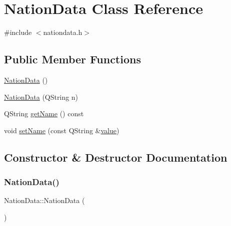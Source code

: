 \hypertarget{class_nation_data}{}\section{Nation\+Data Class Reference}
\label{class_nation_data}


{\ttfamily \#include $<$nationdata.\+h$>$}

\subsection*{Public Member Functions}
\begin{DoxyCompactItemize}
\item 
\mbox{\hyperlink{class_nation_data_a600b1be3c59998bbb7352c71548746bf}{Nation\+Data}} ()
\item 
\mbox{\hyperlink{class_nation_data_aaf364c5ac1dd356170aadba095831e12}{Nation\+Data}} (Q\+String n)
\item 
Q\+String \mbox{\hyperlink{class_nation_data_a098edfcfb8e2edba5e5a5a3eb4972160}{get\+Name}} () const
\item 
void \mbox{\hyperlink{class_nation_data_ab4f756660044ce0c8deab4e86eeff745}{set\+Name}} (const Q\+String \&\mbox{\hyperlink{diffusion_8cpp_a4b41795815d9f3d03abfc739e666d5da}{value}})
\end{DoxyCompactItemize}


\subsection{Constructor \& Destructor Documentation}
\mbox{\label{class_nation_data_a600b1be3c59998bbb7352c71548746bf}} 
\subsubsection{\texorpdfstring{NationData()}{NationData()}\hspace{0.1cm}{\footnotesize\ttfamily [1/2]}}
{\footnotesize\ttfamily Nation\+Data\+::\+Nation\+Data (\begin{DoxyParamCaption}{ }\end{DoxyParamCaption})}

\mbox{\label{class_nation_data_aaf364c5ac1dd356170aadba095831e12}} 
